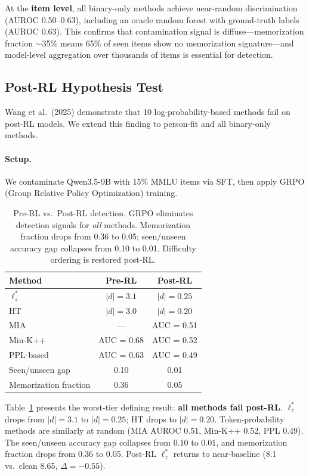 \documentclass[11pt,a4paper]{article}
\begin{document}
At the \textbf{item level}, all binary-only methods achieve near-random discrimination (AUROC 0.50--0.63), including an oracle random forest with ground-truth labels (AUROC 0.63). This confirms that contamination signal is diffuse---memorization fraction $\sim$35\% means 65\% of seen items show no memorization signature---and model-level aggregation over thousands of items is essential for detection.

\subsection{Post-RL Hypothesis Test}\label{sec:post_rl}

Wang et al.\ (2025) demonstrate that 10 log-probability-based methods fail on post-RL models. We extend this finding to person-fit and all binary-only methods.

\paragraph{Setup.} We contaminate Qwen3.5-9B with 15\% MMLU items via SFT, then apply GRPO (Group Relative Policy Optimization) training.

\begin{table}[t]
\centering
\small
\begin{tabular}{lcc}
\toprule
\textbf{Method} & \textbf{Pre-RL} & \textbf{Post-RL} \\
\midrule
$\ell_z^*$ & $|d| = 3.1$ & $|d| = 0.25$ \\
HT & $|d| = 3.0$ & $|d| = 0.20$ \\
MIA & --- & AUC = 0.51 \\
Min-K++ & AUC = 0.68 & AUC = 0.52 \\
PPL-based & AUC = 0.63 & AUC = 0.49 \\
\midrule
Seen/unseen gap & 0.10 & 0.01 \\
Memorization fraction & 0.36 & 0.05 \\
\bottomrule
\end{tabular}
\caption{Pre-RL vs.\ Post-RL detection. GRPO eliminates detection signals for \emph{all} methods. Memorization fraction drops from 0.36 to 0.05; seen/unseen accuracy gap collapses from 0.10 to 0.01. Difficulty ordering is restored post-RL.}
\label{tab:post_rl}
\end{table}

Table~\ref{tab:post_rl} presents the worst-tier defining result: \textbf{all methods fail post-RL}. $\ell_z^*$ drops from $|d| = 3.1$ to $|d| = 0.25$; HT drops to $|d| = 0.20$. Token-probability methods are similarly at random (MIA AUROC 0.51, Min-K++ 0.52, PPL 0.49). The seen/unseen accuracy gap collapses from 0.10 to 0.01, and memorization fraction drops from 0.36 to 0.05. Post-RL $\ell_z^*$ returns to near-baseline (8.1 vs.\ clean 8.65, $\Delta = -0.55$).
\end{document}
